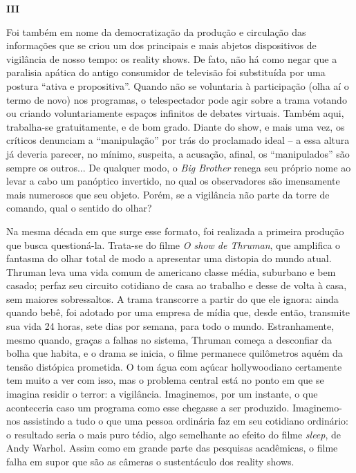 \textbf{III}

Foi também em nome da democratização da produção e circulação das
informações que se criou um dos principais e mais abjetos dispositivos
de vigilância de nosso tempo: os reality shows. De fato, não há como
negar que a paralisia apática do antigo consumidor de televisão foi
substituída por uma postura ``ativa e propositiva''. Quando não se
voluntaria à participação (olha aí o termo de novo) nos programas, o
telespectador pode agir sobre a trama votando ou criando voluntariamente
espaços infinitos de debates virtuais. Também aqui, trabalha-se
gratuitamente, e de bom grado. Diante do show, e mais uma vez, os
críticos denunciam a ``manipulação'' por trás do proclamado ideal -- a
essa altura já deveria parecer, no mínimo, suspeita, a acusação, afinal,
os ``manipulados'' são sempre os outros... De qualquer modo, o \emph{Big
Brother} renega seu próprio nome ao levar a cabo um panóptico invertido,
no qual os observadores são imensamente mais numerosos que seu objeto.
Porém, se a vigilância não parte da torre de comando, qual o sentido do
olhar?

Na mesma década em que surge esse formato, foi realizada a primeira
produção que busca questioná-la. Trata-se do filme \emph{O show de
Thruman}, que amplifica o fantasma do olhar total de modo a apresentar
uma distopia do mundo atual. Thruman leva uma vida comum de americano
classe média, suburbano e bem casado; perfaz seu circuito cotidiano de
casa ao trabalho e desse de volta à casa, sem maiores sobressaltos. A
trama transcorre a partir do que ele ignora: ainda quando bebê, foi
adotado por uma empresa de mídia que, desde então, transmite sua vida 24
horas, sete dias por semana, para todo o mundo. Estranhamente, mesmo
quando, graças a falhas no sistema, Thruman começa a desconfiar da bolha
que habita, e o drama se inicia, o filme permanece quilômetros aquém da
tensão distópica prometida. O tom água com açúcar hollywoodiano
certamente tem muito a ver com isso, mas o problema central está no
ponto em que se imagina residir o terror: a vigilância. Imaginemos, por
um instante, o que aconteceria caso um programa como esse chegasse a ser
produzido. Imaginemo-nos assistindo a tudo o que uma pessoa ordinária
faz em seu cotidiano ordinário: o resultado seria o mais puro tédio,
algo semelhante ao efeito do filme \emph{sleep}, de Andy Warhol. Assim
como em grande parte das pesquisas acadêmicas, o filme falha em supor
que são as câmeras o sustentáculo dos reality shows.


